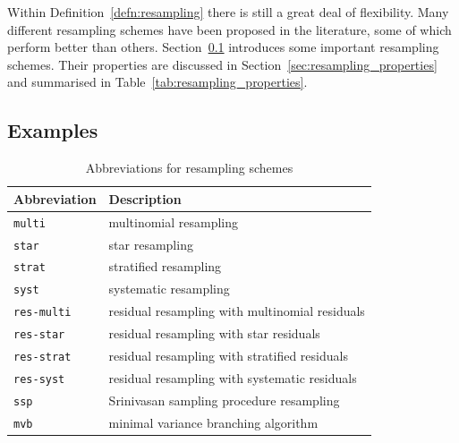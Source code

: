 Within Definition~\ref{defn:resampling} there is still a great deal of flexibility. Many different resampling schemes have been proposed in the literature, some of which perform better than others.
 Section~\ref{sec:examples_resamplingschemes} introduces some important resampling schemes. Their properties are discussed in Section~\ref{sec:resampling_properties} and summarised in Table~\ref{tab:resampling_properties}.



\subsection{Examples}
\label{sec:examples_resamplingschemes}

\begin{table}[ht]
\centering
\begin{tabular}{ l l }
\hline\hline
Abbreviation & Description \\%
\hline
\texttt{multi} & multinomial resampling \\%
\texttt{star} & star resampling \\%
\texttt{strat} & stratified resampling \\%
\texttt{syst} & systematic resampling \\%
\texttt{res-multi} & residual resampling with multinomial residuals \\
\texttt{res-star} & residual resampling with star residuals \\
\texttt{res-strat} & residual resampling with stratified residuals \\
\texttt{res-syst} & residual resampling with systematic residuals \\
\texttt{ssp} & Srinivasan sampling procedure resampling \\%
\texttt{mvb} & minimal variance branching algorithm \\%
\hline\hline
\end{tabular}
\caption{Abbreviations for resampling schemes}
\label{tab:resampling_abbrevs}
\end{table} 



